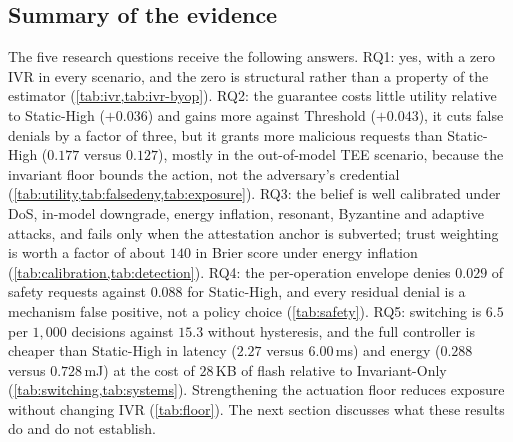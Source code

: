 

\subsection{Summary of the evidence}
\label{sec:eval-summary}

The five research questions receive the following answers. RQ1: yes, with a
zero IVR in every scenario, and the zero is structural rather than a property of
the estimator (\cref{tab:ivr,tab:ivr-byop}). RQ2: the guarantee costs little
utility relative to Static-High ($+0.036$) and gains more against Threshold
($+0.043$), it cuts false denials by a factor of three, but it grants more
malicious requests than Static-High ($0.177$ versus $0.127$), mostly in the
out-of-model TEE scenario, because the invariant floor bounds the action, not the
adversary's credential (\cref{tab:utility,tab:falsedeny,tab:exposure}). RQ3: the
belief is well calibrated under DoS, in-model downgrade, energy inflation,
resonant, Byzantine and adaptive attacks, and fails only when the attestation
anchor is subverted; trust weighting is worth a factor of about $140$ in Brier score
under energy inflation (\cref{tab:calibration,tab:detection}). RQ4: the
per-operation envelope denies $0.029$ of safety requests against $0.088$ for
Static-High, and every residual denial is a mechanism false positive, not a
policy choice (\cref{tab:safety}). RQ5: switching is $6.5$ per $1{,}000$
decisions against $15.3$ without hysteresis, and the full controller is cheaper
than Static-High in latency ($2.27$ versus $6.00$\,ms) and energy ($0.288$ versus
$0.728$\,mJ) at the cost of $28$\,KB of flash relative to Invariant-Only
(\cref{tab:switching,tab:systems}). Strengthening the actuation floor reduces
exposure without changing IVR (\cref{tab:floor}). The next section discusses what
these results do and do not establish.
